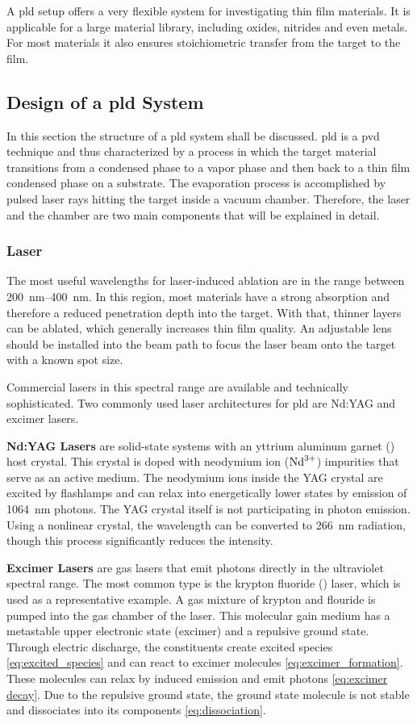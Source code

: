  A \ac{pld} setup offers a very flexible system for investigating thin film materials.
It is applicable for a large material library, including oxides, nitrides and even
metals. 
For most materials it also ensures stoichiometric transfer from the target to the film.

\subsection{Design of a \ac{pld} System}
In this section the structure of a \ac{pld} system shall be discussed.
\ac{pld} is a \ac{pvd} technique and thus characterized by a process in which the target
material transitions from a condensed phase to a vapor phase and then back to a thin 
film condensed phase on a substrate.
The evaporation process is accomplished by pulsed laser rays hitting the target inside
a vacuum chamber. 
Therefore, the laser and the chamber are  two main components that will be
explained in detail.

\subsubsection{Laser}
The most useful wavelengths for laser-induced ablation are in the range between
\qtyrange{200}{400}{\nano \meter}. 
In this region, most materials have a strong absorption and therefore a reduced 
penetration depth into the target. 
With that, thinner layers can be ablated, which generally increases thin film quality.
An adjustable lens should be installed into the beam path to focus the laser beam onto 
the target with a known spot size.

Commercial lasers in this spectral range are available and technically sophisticated.
Two commonly used laser architectures for \ac{pld} are Nd:YAG and excimer lasers.

\textbf{Nd:YAG Lasers}
are solid-state systems with an yttrium aluminum garnet () host
crystal.
This crystal is doped with neodymium ion ($\ce{Nd^{{3+}}}$) impurities that serve as an
active medium.
The neodymium ions inside the YAG crystal are excited by flashlamps and can 
relax into energetically lower states by emission of \qty{1064}{\nano\meter} photons. 
The YAG crystal itself is not participating in photon emission.
Using a nonlinear crystal, the wavelength can be converted to \qty{266}{\nano\meter} 
radiation, though this process significantly reduces the intensity.

\textbf{Excimer Lasers} are gas lasers that emit photons directly in the ultraviolet 
spectral range.
The most common type is the krypton fluoride () laser, which is used as 
a representative example. 
A gas mixture of krypton and flouride is pumped into the gas chamber of the laser.
This molecular gain medium has a metastable upper electronic state (excimer) 
and a repulsive ground state.
Through electric discharge, the constituents create excited species 
\cref{eq:excited_species} and can react to excimer molecules \cref{eq:excimer_formation}.
These molecules can relax by induced emission and emit photons \cref{eq:excimer decay}.
Due to the repulsive ground state, the ground state molecule is not stable and
dissociates into its components \cref{eq:dissociation}.

